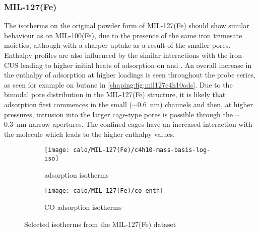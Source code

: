 
\subsubsection{MIL-127(Fe)}

The isotherms on the original powder form of MIL-127(Fe)
should show similar behaviour as on MIL-100(Fe),
due to the presence of the same iron trimesate moieties,
although with a sharper uptake as a result of the smaller pores. Enthalpy
profiles are also influenced by the similar interactions with the iron
\gls{CUS} leading to higher initial heats of adsorption on  and .
An overall increase in the enthalpy of adsorption at higher loadings is seen
throughout the probe series, as seen for example on butane in
\autoref{shaping:fig:mil127c4h10ads}.
Due to the bimodal pore distribution in the MIL-127(Fe) structure,
it is likely that adsorption first commences in the small
(\( \sim \)\SI{0.6}{\nano\metre}) channels and then, at higher pressures,
intrusion into the larger cage-type pores is possible through the
\( \sim \)\SI{0.3}{\nano\metre} narrow apertures.
The confined cages have an increased interaction with the molecule
which leads to the higher enthalpy values.

\begin{figure}[!htb]
	\centering
	\begin{subfigure}{0.45\textwidth}
		\texttt{[image: calo/MIL-127(Fe)/c4h10-mass-basis-log-iso]}
		\caption{ adsorption isotherms}%
		\label{shaping:fig:mil127c4h10ads}
	\end{subfigure}%
	\begin{subfigure}{0.45\textwidth}
		\texttt{[image: calo/MIL-127(Fe)/co-enth]}
		\caption{CO adsorption isotherms}%
		\label{shaping:fig:mil127coads}
	\end{subfigure}%
	\caption{Selected isotherms from the MIL-127(Fe) dataset}%
	\label{shaping:fig:mil127isotherms}
\end{figure}


